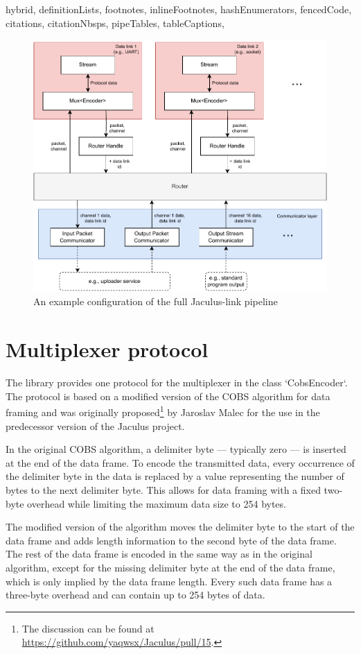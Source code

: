 \begin{markdown*}{%
  hybrid,
  definitionLists,
  footnotes,
  inlineFootnotes,
  hashEnumerators,
  fencedCode,
  citations,
  citationNbsps,
  pipeTables,
  tableCaptions,
}
\begin{figure}[!ht]
    \centering
    \includegraphics[width=\textwidth]{img/link-pipeline}
    \caption{An example configuration of the full Jaculus-link pipeline}
    \label{fig:link-pipeline}
\end{figure}


\section{Multiplexer protocol} \label{sec:mux-protocol}

The library provides one protocol for the multiplexer in the class `CobsEncoder`. The protocol is based on a modified version of the COBS\cite{cobs} algorithm for data framing and was originally proposed\footnote{The discussion can be found at \url{https://github.com/yaqwsx/Jaculus/pull/15}.} by Jaroslav Malec for the use in the predecessor version of the Jaculus project.

In the original COBS algorithm, a delimiter byte --- typically zero --- is inserted at the end of the data frame. To encode the transmitted data, every occurrence of the delimiter byte in the data is replaced by a value representing the number of bytes to the next delimiter byte. This allows for data framing with a fixed two-byte overhead while limiting the maximum data size to 254 bytes.

The modified version of the algorithm moves the delimiter byte to the start of the data frame and adds length information to the second byte of the data frame. The rest of the data frame is encoded in the same way as in the original algorithm, except for the missing delimiter byte at the end of the data frame, which is only implied by the data frame length. Every such data frame has a three-byte overhead and can contain up to 254 bytes of data.


\end{markdown*}
